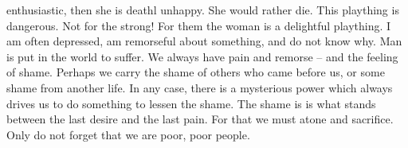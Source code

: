 enthusiastic, then she is deathl unhappy. She would rather die. This plaything is dangerous. Not for the strong! For them the woman is a delightful plaything. I am often depressed, am remorseful about something, and do not know why. Man is put in the world to suffer. We always have pain and remorse -- and the feeling of shame. Perhaps we carry the shame of others who came before us, or some shame from another life. In any case, there is a mysterious power which always drives us to do something to lessen the shame. The shame is is what stands between the last desire and the last pain. For that we must atone and sacrifice. Only do not forget that we are poor, poor people.

%